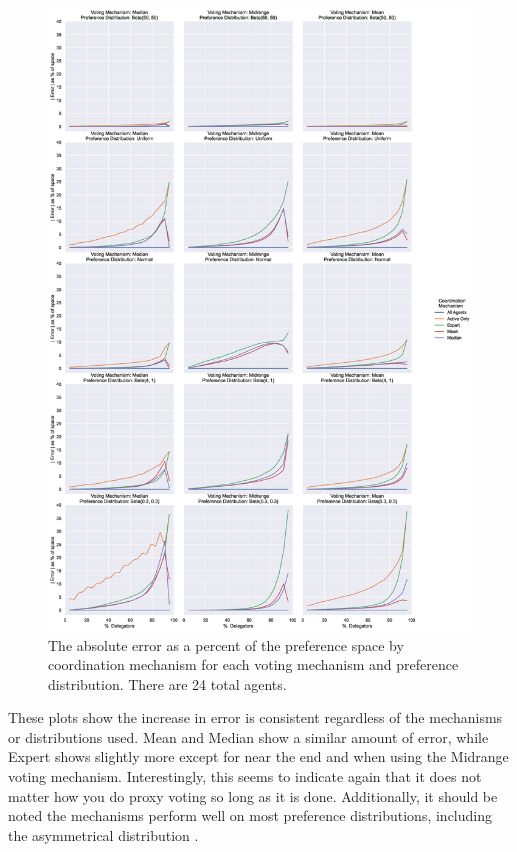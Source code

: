 \begin{figure}[p]
    \centering
    \includegraphics[scale=0.30]
    {content/chapter2/figures/distribution_error_as_percent_of_space_abs_mean}
    \caption{
        The absolute error as a percent of the preference space by coordination
        mechanism for each voting mechanism and preference distribution.
        There are 24 total agents.
    }
    \label{fig:\chptindicator-distribution-error-as-percent-of-space-abs-mean}
\end{figure}

These plots show the increase in error is consistent regardless of the mechanisms or
distributions used.
Mean and Median show a similar amount of error, while Expert shows slightly more
except for near the end and when using the Midrange voting mechanism.
Interestingly, this seems to indicate again that it does not matter how you do proxy
voting so long as it is done.
Additionally, it should be noted the mechanisms perform well on most preference
distributions, including the asymmetrical distribution .

